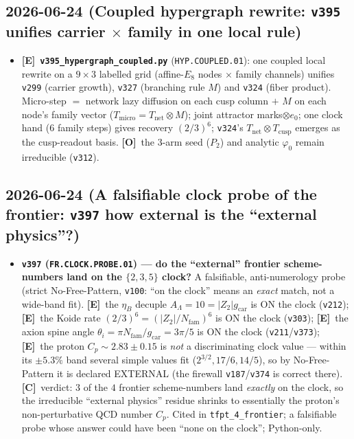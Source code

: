 \documentclass[11pt]{article}
\providecommand{\mE}{\textbf{[E]}}\providecommand{\mC}{\textbf{[C]}}
\providecommand{\mO}{\textbf{[O]}}\providecommand{\mX}{\textbf{[X]}}
\providecommand{\vref}[1]{\texttt{#1}}
\providecommand{\gcar}{g_{\mathrm{car}}}\providecommand{\Nfam}{N_{\mathrm{fam}}}
\begin{document}
\subsection*{2026-06-24 (Coupled hypergraph rewrite: \texttt{v395} unifies carrier $\times$ family in one local rule)}
\begin{itemize}
  \item \mE\ \textbf{\texttt{v395\_hypergraph\_coupled.py}} (\texttt{HYP.COUPLED.01}): one coupled local rewrite on a $9\times3$ labelled grid (affine-$E_8$ nodes $\times$ family channels) unifies \texttt{v299} (carrier growth), \texttt{v327} (branching rule $M$) and \texttt{v324} (fiber product). Micro-step $=$ network lazy diffusion on each cusp column $+$ $M$ on each node's family vector ($T_{\mathrm{micro}}=T_{\mathrm{net}}\otimes M$); joint attractor marks$\otimes e_0$; one clock hand ($6$ family steps) gives recovery $(2/3)^6$; \texttt{v324}'s $T_{\mathrm{net}}\otimes T_{\mathrm{cusp}}$ emerges as the cusp-readout basis. \mO\ the $3$-arm seed ($P_2$) and analytic $\varphi_0$ remain irreducible (\texttt{v312}).
\end{itemize}

\subsection*{2026-06-24 (A falsifiable clock probe of the frontier: \texttt{v397} how external is the ``external physics''?)}
\begin{itemize}
\item \textbf{\texttt{v397} (\texttt{FR.CLOCK.PROBE.01}) --- do the ``external'' frontier scheme-numbers land on the
$\{2,3,5\}$ clock?} A falsifiable, anti-numerology probe (strict No-Free-Pattern, \vref{v100}: ``on the clock'' means
an \emph{exact} match, not a wide-band fit). \mE\ the $\eta_B$ decuple $A_\Lambda=10=|Z_2|\gcar$ is ON the clock
(\vref{v212}); \mE\ the Koide rate $(2/3)^6=(|Z_2|/\Nfam)^6$ is ON the clock (\vref{v303}); \mE\ the axion spine angle
$\theta_i=\pi\Nfam/\gcar=3\pi/5$ is ON the clock (\vref{v211}/\vref{v373}); \mE\ the proton $C_p\sim2.83\pm0.15$ is
\emph{not} a discriminating clock value --- within its $\pm5.3\%$ band several simple values fit
($2^{3/2},17/6,14/5$), so by No-Free-Pattern it is declared EXTERNAL (the firewall \vref{v187}/\vref{v374} is correct
there). \mC\ verdict: $3$ of the $4$ frontier scheme-numbers land \emph{exactly} on the clock, so the irreducible
``external physics'' residue shrinks to essentially the proton's non-perturbative QCD number $C_p$. Cited in
\texttt{tfpt\_4\_frontier}; a falsifiable probe whose answer could have been ``none on the clock''; Python-only.
\end{itemize}
\end{document}

